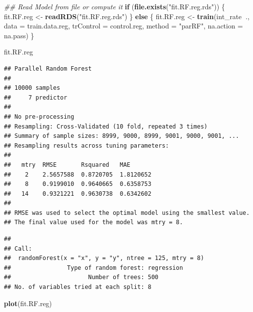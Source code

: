 \documentclass[]{article}
\newenvironment{Shaded}{\begin{snugshade}}{\end{snugshade}}
\newcommand{\CommentTok}[1]{\textcolor[rgb]{0.56,0.35,0.01}{\textit{#1}}}
\newcommand{\ControlFlowTok}[1]{\textcolor[rgb]{0.13,0.29,0.53}{\textbf{#1}}}
\newcommand{\DataTypeTok}[1]{\textcolor[rgb]{0.13,0.29,0.53}{#1}}
\newcommand{\KeywordTok}[1]{\textcolor[rgb]{0.13,0.29,0.53}{\textbf{#1}}}
\newcommand{\NormalTok}[1]{#1}
\newcommand{\OperatorTok}[1]{\textcolor[rgb]{0.81,0.36,0.00}{\textbf{#1}}}
\newcommand{\StringTok}[1]{\textcolor[rgb]{0.31,0.60,0.02}{#1}}
\begin{document}
\begin{Shaded}
\begin{Highlighting}[]
\CommentTok{## Read Model from file or compute it }
\ControlFlowTok{if}\NormalTok{ (}\KeywordTok{file.exists}\NormalTok{(}\StringTok{"fit.RF.reg.rds"}\NormalTok{)) \{}
\NormalTok{   fit.RF.reg <-}\StringTok{ }\KeywordTok{readRDS}\NormalTok{(}\StringTok{"fit.RF.reg.rds"}\NormalTok{)}
\NormalTok{\} }\ControlFlowTok{else}\NormalTok{ \{}
\NormalTok{   fit.RF.reg <-}\StringTok{ }\KeywordTok{train}\NormalTok{(int_rate}\OperatorTok{~}\NormalTok{.,}
                    \DataTypeTok{data =}\NormalTok{ train.data.reg,}
                    \DataTypeTok{trControl =}\NormalTok{ control.reg,}
                    \DataTypeTok{method =} \StringTok{"parRF"}\NormalTok{,}
                    \DataTypeTok{na.action =}\NormalTok{ na.pass)}
\NormalTok{\}}

\NormalTok{fit.RF.reg}
\end{Highlighting}
\end{Shaded}

\begin{verbatim}
## Parallel Random Forest 
## 
## 10000 samples
##     7 predictor
## 
## No pre-processing
## Resampling: Cross-Validated (10 fold, repeated 3 times) 
## Summary of sample sizes: 8999, 9000, 8999, 9001, 9000, 9001, ... 
## Resampling results across tuning parameters:
## 
##   mtry  RMSE       Rsquared   MAE      
##    2    2.5657588  0.8720705  1.8120652
##    8    0.9199010  0.9640665  0.6358753
##   14    0.9321221  0.9630738  0.6342602
## 
## RMSE was used to select the optimal model using the smallest value.
## The final value used for the model was mtry = 8.
\end{verbatim}

\begin{Shaded}
\end{Shaded}

\begin{verbatim}
## 
## Call:
##  randomForest(x = "x", y = "y", ntree = 125, mtry = 8) 
##                Type of random forest: regression
##                      Number of trees: 500
## No. of variables tried at each split: 8
\end{verbatim}

\begin{Shaded}
\begin{Highlighting}[]
\KeywordTok{plot}\NormalTok{(fit.RF.reg)}
\end{Highlighting}
\end{Shaded}
\end{document}
